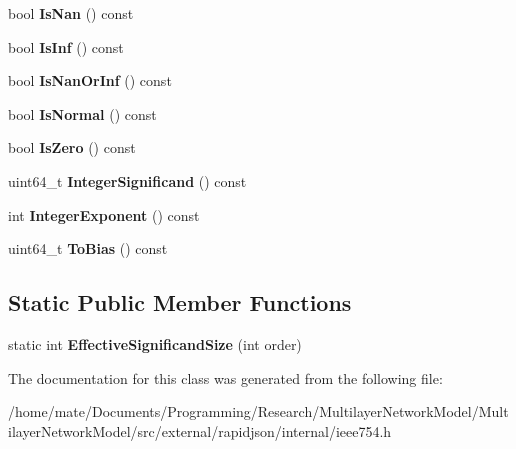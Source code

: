 \begin{DoxyCompactItemize}
\item 
bool {\bfseries Is\+Nan} () const \hypertarget{classinternal_1_1Double_a5c1ad93b8c866afdd5c2b412ef7bea98}{}\label{classinternal_1_1Double_a5c1ad93b8c866afdd5c2b412ef7bea98}

\item 
bool {\bfseries Is\+Inf} () const \hypertarget{classinternal_1_1Double_a2efab47ffbfa75e0fca1129263b86545}{}\label{classinternal_1_1Double_a2efab47ffbfa75e0fca1129263b86545}

\item 
bool {\bfseries Is\+Nan\+Or\+Inf} () const \hypertarget{classinternal_1_1Double_a5b5cc0b8552246f9e274b00a010bd676}{}\label{classinternal_1_1Double_a5b5cc0b8552246f9e274b00a010bd676}

\item 
bool {\bfseries Is\+Normal} () const \hypertarget{classinternal_1_1Double_ac34b7871eeb80d2b6bac48f144c97b51}{}\label{classinternal_1_1Double_ac34b7871eeb80d2b6bac48f144c97b51}

\item 
bool {\bfseries Is\+Zero} () const \hypertarget{classinternal_1_1Double_a6eb58f2690af582efeb9b76ef35c4c60}{}\label{classinternal_1_1Double_a6eb58f2690af582efeb9b76ef35c4c60}

\item 
uint64\+\_\+t {\bfseries Integer\+Significand} () const \hypertarget{classinternal_1_1Double_a96c5e0f06551e83565b5097950d30e32}{}\label{classinternal_1_1Double_a96c5e0f06551e83565b5097950d30e32}

\item 
int {\bfseries Integer\+Exponent} () const \hypertarget{classinternal_1_1Double_a8e16ee31d521fb56f0b98be427a9d47e}{}\label{classinternal_1_1Double_a8e16ee31d521fb56f0b98be427a9d47e}

\item 
uint64\+\_\+t {\bfseries To\+Bias} () const \hypertarget{classinternal_1_1Double_af8b543dc813f761d274824f7cef00a43}{}\label{classinternal_1_1Double_af8b543dc813f761d274824f7cef00a43}

\end{DoxyCompactItemize}
\subsection*{Static Public Member Functions}
\begin{DoxyCompactItemize}
\item 
static int {\bfseries Effective\+Significand\+Size} (int order)\hypertarget{classinternal_1_1Double_aa710fa4f5e06b0ff4348a13475688f13}{}\label{classinternal_1_1Double_aa710fa4f5e06b0ff4348a13475688f13}

\end{DoxyCompactItemize}


The documentation for this class was generated from the following file\+:\begin{DoxyCompactItemize}
\item 
/home/mate/\+Documents/\+Programming/\+Research/\+Multilayer\+Network\+Model/\+Multilayer\+Network\+Model/src/external/rapidjson/internal/ieee754.\+h\end{DoxyCompactItemize}
